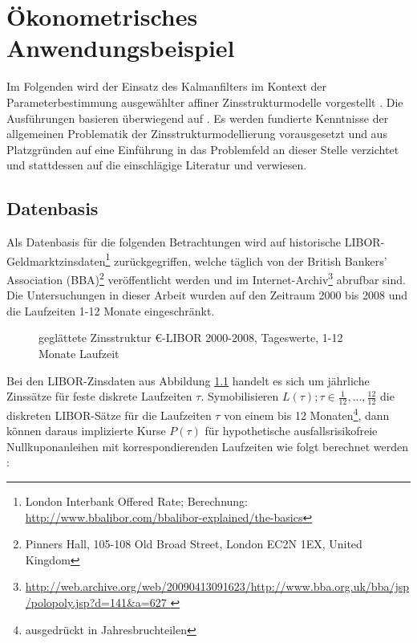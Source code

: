 \documentclass[12pt,a4paper,headsepline,bibliography=totoc,listof=totoc,headinclude=false,footinclude=false,BCOR5mm]{scrreprt} %
\begin{document}
\chapter{{\"O}konometrisches Anwendungsbeispiel}\label{aw}
Im Folgenden wird der Einsatz des Kalmanfilters im Kontext der Parameterbestimmung ausgew{\"a}hlter affiner Zinsstrukturmodelle vorgestellt \cite{Duffie1996,Cox1985,Vasicek1977}. Die Ausf{\"u}hrungen basieren {\"u}berwiegend auf \cite{Bolder2001,Idler2011}. Es werden fundierte Kenntnisse der allgemeinen Problematik der Zinsstrukturmodellierung vorausgesetzt und aus Platzgr{\"u}nden auf eine Einf{\"u}hrung in das Problemfeld an dieser Stelle verzichtet und stattdessen auf die einschl{\"a}gige Literatur \cite{Damiano2007,Rudolf2000,Wilmott2007,Andersen2010b,Andersen2010a,Hughston2003,Rebonato2003} und \cite{Idler2011} verwiesen. 

\section{Datenbasis}\label{datenbasis} Als Datenbasis f{\"u}r die folgenden Betrachtungen wird auf historische LIBOR-Geld\-markt\-zinsdaten\footnote{London Interbank Offered Rate; Berechnung: \url{ http://www.bbalibor.com/bbalibor-explained/the-basics}} zur{\"u}ckgegriffen, welche t{\"a}glich von der British Bankers' Association (BBA)\footnote{Pinners Hall, 105-108 Old Broad Street, London EC2N 1EX, United Kingdom} ver{\"o}ffentlicht werden und im Internet-Archiv\footnote{\url{http://web.archive.org/web/20090413091623/http://www.bba.org.uk/bba/jsp/polopoly.jsp?d=141&a=627
}} abrufbar sind. Die Untersuchungen in dieser Arbeit wurden auf den Zeitraum 2000 bis 2008  und die Laufzeiten 1-12 Monate eingeschr{\"a}nkt. \begin{figure}[h!]
    \centering
{}
\caption[gegl{\"a}ttete Zinsstruktur \euro-LIBOR 2000-2008, Tageswerte, 1-12 Monate Laufzeit]{gegl{\"a}ttete Zinsstruktur \euro-LIBOR 2000-2008, Tageswerte, 1-12 Monate Laufzeit} \label{libor}
\end{figure} Bei den LIBOR-Zinsdaten aus  Abbildung \ref{libor} handelt es sich um j{\"a}hrliche Zinss{\"a}tze f{\"u}r feste diskrete Laufzeiten $\tau$. Symobilisieren $L(\tau); \tau \in \frac{1}{12}, ..., \frac{12}{12}$ die diskreten LIBOR-S{\"a}tze f{\"u}r die Laufzeiten $\tau$ von einem bis 12 Monaten\footnote{ausgedr{\"u}ckt in Jahresbruchteilen}, dann k{\"o}nnen daraus implizierte Kurse $P(\tau)$ f{\"u}r hypothetische ausfallsrisikofreie Nullkuponanleihen mit korrespondierenden Laufzeiten wie folgt berechnet werden \cite[S. 16ff.]{Chance2004}:
\end{document}
